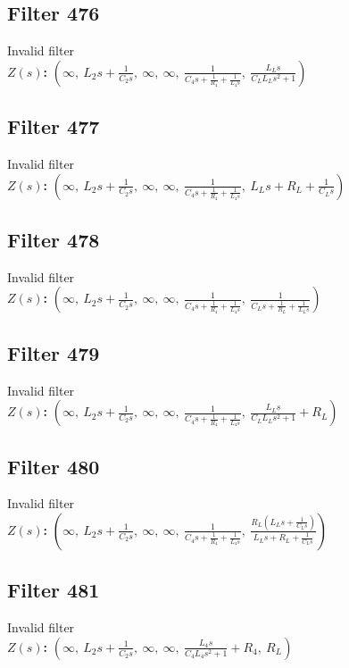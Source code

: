 \documentclass{article}
\begin{document}
\subsection*{Filter 476}
Invalid filter \\ 
\textbf{$Z(s)$:} $\left( \infty, \  L_{2} s + \frac{1}{C_{2} s}, \  \infty, \  \infty, \  \frac{1}{C_{4} s + \frac{1}{R_{4}} + \frac{1}{L_{4} s}}, \  \frac{L_{L} s}{C_{L} L_{L} s^{2} + 1}\right)$ \\ 
\subsection*{Filter 477}
Invalid filter \\ 
\textbf{$Z(s)$:} $\left( \infty, \  L_{2} s + \frac{1}{C_{2} s}, \  \infty, \  \infty, \  \frac{1}{C_{4} s + \frac{1}{R_{4}} + \frac{1}{L_{4} s}}, \  L_{L} s + R_{L} + \frac{1}{C_{L} s}\right)$ \\ 
\subsection*{Filter 478}
Invalid filter \\ 
\textbf{$Z(s)$:} $\left( \infty, \  L_{2} s + \frac{1}{C_{2} s}, \  \infty, \  \infty, \  \frac{1}{C_{4} s + \frac{1}{R_{4}} + \frac{1}{L_{4} s}}, \  \frac{1}{C_{L} s + \frac{1}{R_{L}} + \frac{1}{L_{L} s}}\right)$ \\ 
\subsection*{Filter 479}
Invalid filter \\ 
\textbf{$Z(s)$:} $\left( \infty, \  L_{2} s + \frac{1}{C_{2} s}, \  \infty, \  \infty, \  \frac{1}{C_{4} s + \frac{1}{R_{4}} + \frac{1}{L_{4} s}}, \  \frac{L_{L} s}{C_{L} L_{L} s^{2} + 1} + R_{L}\right)$ \\ 
\subsection*{Filter 480}
Invalid filter \\ 
\textbf{$Z(s)$:} $\left( \infty, \  L_{2} s + \frac{1}{C_{2} s}, \  \infty, \  \infty, \  \frac{1}{C_{4} s + \frac{1}{R_{4}} + \frac{1}{L_{4} s}}, \  \frac{R_{L} \left(L_{L} s + \frac{1}{C_{L} s}\right)}{L_{L} s + R_{L} + \frac{1}{C_{L} s}}\right)$ \\ 
\subsection*{Filter 481}
Invalid filter \\ 
\textbf{$Z(s)$:} $\left( \infty, \  L_{2} s + \frac{1}{C_{2} s}, \  \infty, \  \infty, \  \frac{L_{4} s}{C_{4} L_{4} s^{2} + 1} + R_{4}, \  R_{L}\right)$ \\ 
\end{document}
